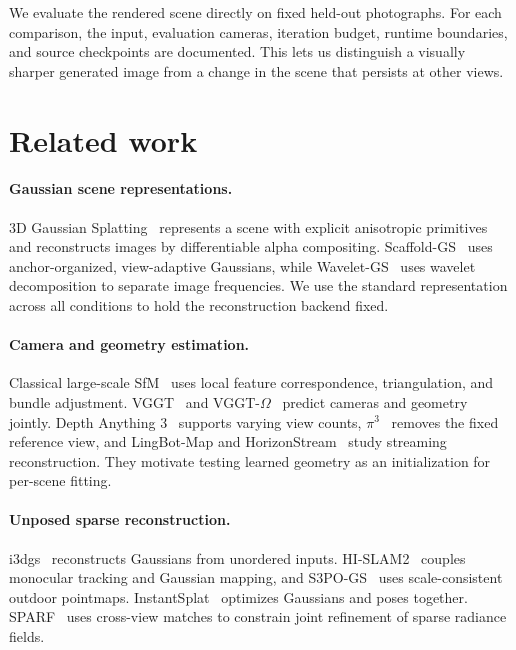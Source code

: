 \documentclass[10pt,twocolumn,letterpaper]{article}
\begin{document}
We evaluate the rendered scene directly on fixed held-out photographs. For each comparison, the input, evaluation cameras, iteration budget, runtime boundaries, and source checkpoints are documented. This lets us distinguish a visually sharper generated image from a change in the scene that persists at other views.

\section{Related work}
\paragraph{Gaussian scene representations.}
3D Gaussian Splatting~\cite{kerbl2023gaussians} represents a scene with explicit anisotropic primitives and reconstructs images by differentiable alpha compositing. Scaffold-GS~\cite{lu2024scaffold} uses anchor-organized, view-adaptive Gaussians, while Wavelet-GS~\cite{zhao2025wavelet} uses wavelet decomposition to separate image frequencies. We use the standard representation across all conditions to hold the reconstruction backend fixed.

\paragraph{Camera and geometry estimation.}
Classical large-scale SfM~\cite{agarwal2011rome,schonberger2016sfm} uses local feature correspondence, triangulation, and bundle adjustment. VGGT~\cite{wang2025vggt} and VGGT-$\Omega$~\cite{wang2026vggtomega} predict cameras and geometry jointly. Depth Anything 3~\cite{lin2025da3} supports varying view counts, $\pi^3$~\cite{wang2025pi3} removes the fixed reference view, and LingBot-Map and HorizonStream~\cite{chen2026lingbot,cheng2026horizon} study streaming reconstruction. They motivate testing learned geometry as an initialization for per-scene fitting.

\paragraph{Unposed sparse reconstruction.}
i3dgs~\cite{meuleman2026i3dgs} reconstructs Gaussians from unordered inputs. HI-SLAM2~\cite{zhang2025hislam} couples monocular tracking and Gaussian mapping, and S3PO-GS~\cite{cheng2025s3po} uses scale-consistent outdoor pointmaps. InstantSplat~\cite{fan2024instantsplat} optimizes Gaussians and poses together. SPARF~\cite{truong2023sparf} uses cross-view matches to constrain joint refinement of sparse radiance fields.
\end{document}
